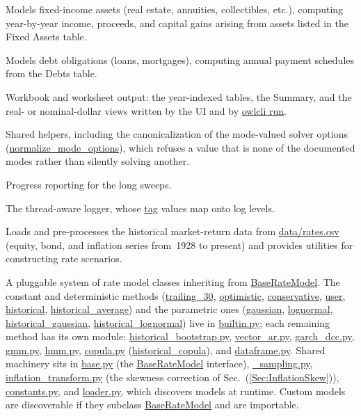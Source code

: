 \documentclass[fleqn,12pt]{report}
\newcommand{\code}[1]{\url{#1}}
\begin{document}
\begin{sloppypar}
\begin{description}[style=nextline, leftmargin=2.5cm, font=\ttfamily]
\item[fixedassets.py]
Models fixed-income assets (real estate, annuities, collectibles, etc.),
computing year-by-year income, proceeds, and capital gains arising from
assets listed in the Fixed Assets table.

\item[debts.py]
Models debt obligations (loans, mortgages), computing annual payment
schedules from the Debts table.

\item[export.py]
Workbook and worksheet output: the year-indexed tables, the Summary, and the
real- or nominal-dollar views written by the UI and by \code{owlcli run}.

\item[utils.py]
Shared helpers, including the canonicalization of the mode-valued solver options
(\code{normalize_mode_options}), which refuses a value that is none of the
documented modes rather than silently solving another.

\item[progress.py]
Progress reporting for the long sweeps.

\item[mylogging.py]
The thread-aware logger, whose \code{tag} values map onto log levels.

\item[rates.py]
Loads and pre-processes the historical market-return data from
\code{data/rates.csv} (equity, bond, and inflation series from~1928
to present) and provides utilities for constructing rate scenarios.

\item[rate\_models/]
A pluggable system of rate model classes inheriting from \code{BaseRateModel}.
The constant and deterministic methods (\code{trailing_30}, \code{optimistic},
\code{conservative}, \code{user}, \code{historical},
\code{historical_average}) and the parametric ones (\code{gaussian},
\code{lognormal}, \code{historical_gaussian}, \code{historical_lognormal})
live in \code{builtin.py}; each remaining method has its own module:
\code{historical_bootstrap.py}, \code{vector_ar.py}, \code{garch_dcc.py},
\code{gmm.py}, \code{hmm.py}, \code{copula.py} (\code{historical_copula}),
and \code{dataframe.py}.
Shared machinery sits in \code{base.py} (the \code{BaseRateModel} interface),
\code{_sampling.py}, \code{inflation_transform.py} (the skewness correction of
Sec.~(\ref{Sec:InflationSkew})), \code{constants.py}, and \code{loader.py},
which discovers models at runtime.
Custom models are discoverable if they subclass \code{BaseRateModel} and are
importable.


\end{description}
\end{sloppypar}
\end{document}
